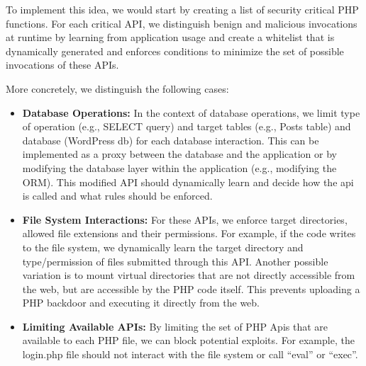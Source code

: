 To implement this idea, we would start by creating a list of security critical PHP functions.
For each critical API, we distinguish benign and malicious invocations at runtime by learning from application usage and create a whitelist that is dynamically generated and enforces conditions to minimize the set of possible invocations of these APIs.

More concretely, we distinguish the following cases:
\begin{itemize}
  \item \textbf{Database Operations:} In the context of database operations, we limit type of operation (e.g., SELECT query) and target tables (e.g., Posts table) and database (WordPress db) for each database interaction. This can be implemented as a proxy between the database and the application or by modifying the database layer within the application (e.g., modifying the ORM). This modified API should dynamically learn and decide how the api is called and what rules should be enforced.
  \item \textbf{File System Interactions:} For these APIs, we enforce target directories, allowed file extensions and their permissions. For example, if the code writes to the file system, we dynamically learn the target directory and type/permission of files submitted through this API.
  Another possible variation is to mount virtual directories that are not directly accessible from the web, but are accessible by the PHP code itself. This prevents uploading a PHP backdoor and executing it directly from the web.
  \item \textbf{Limiting Available APIs:} By limiting the set of PHP Apis that are available to each PHP file, we can block potential exploits. For example, the login.php file should not interact with the file system or call ``eval'' or ``exec''.
\end{itemize}
